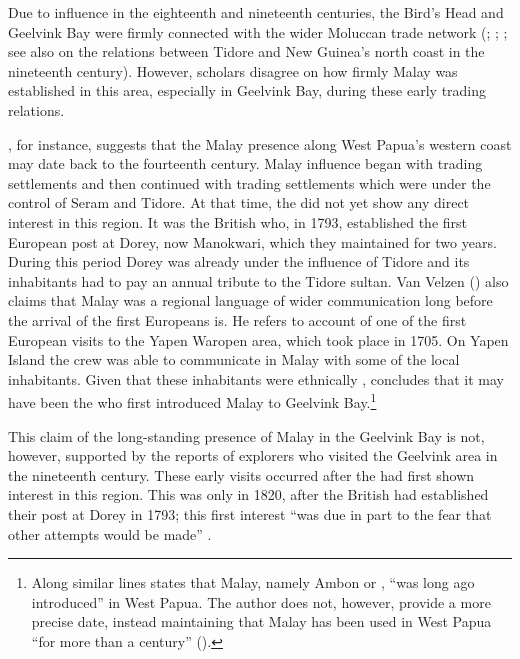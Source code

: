 {Due to  influence in the eighteenth and nineteenth centuries, the Bird’s Head and Geelvink Bay were firmly connected with the wider Moluccan trade network (\citealt[72]{Seiler.1982}; \citealt[2--3]{Timmer.2002}; \citealt[314–315]{vanVelzen.1995}; see also \citealt{Huizinga.1998} on the relations between Tidore and New Guinea’s north coast in the nineteenth century). However, scholars disagree on how firmly Malay was established in this area, especially in Geelvink Bay, during these early trading relations.


\largerpage
\citet[53]{Rowley.1972}, for instance, suggests that the Malay presence along West Papua’s western coast may date back to the fourteenth century. Malay influence began with  trading settlements and then continued with trading settlements which were under the control of Seram and Tidore. At that time, the  did not yet show any direct interest in this region. It was the British who, in 1793, established the first European post at Dorey, now Manokwari, which they maintained for two years. During this period Dorey was already under the influence of Tidore and its inhabitants had to pay an annual tribute to the Tidore sultan. Van Velzen (\citeyear*[314–315]{vanVelzen.1995}) also claims that Malay was a regional language of wider communication long before the arrival of the first Europeans is. He refers to  account of one of the first European visits to the Yapen Waropen area, which took place in 1705. On Yapen Island the crew was able to communicate in Malay with some of the local inhabitants. Given that these inhabitants were ethnically , \citet{vanVelzen.1995} concludes that it may have been the  who first introduced Malay to Geelvink Bay.\footnote{Along similar lines \citet[3]{Samaun.1979} states that Malay, namely Ambon or ,  ``was long ago introduced'' in West Papua. The author does not, however, provide a more precise date, instead maintaining that Malay has been used in West Papua  ``for more than a century'' (\citeyear*[3]{Samaun.1979}).}

 
This claim of the long-standing presence of Malay in the Geelvink Bay is not, however, supported by the reports of explorers who visited the Geelvink area in the nineteenth century. These early visits occurred after the  had first shown interest in this region. This was only in 1820, after the British had established their post at Dorey in 1793; this first  interest  ``was due in part to the fear that other attempts would be made'' \citep[53]{Rowley.1972}.



}
